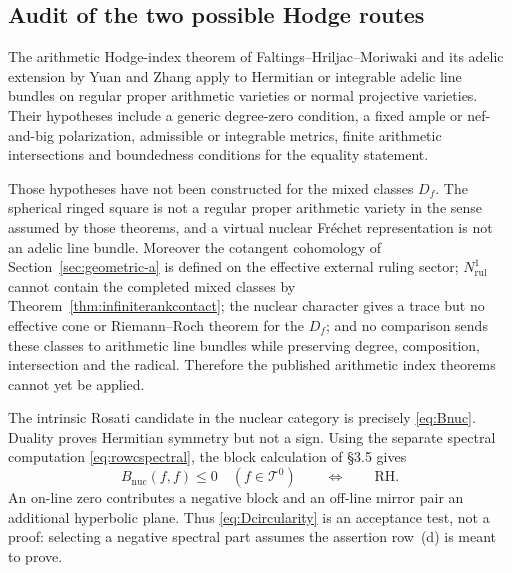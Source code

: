 \documentclass[11pt]{amsart}
\theoremstyle{definition}
\theoremstyle{remark}
\newcommand{\RH}{\mathrm{RH}}
\begin{document}
\subsection{Audit of the two possible Hodge routes}

The arithmetic Hodge-index theorem of Faltings--Hriljac--Moriwaki and its
adelic extension by Yuan and Zhang \cite[Theorems~1.1 and~1.3]{YuanZhang}
apply to Hermitian or integrable adelic line bundles on regular proper
arithmetic varieties or normal projective varieties.  Their hypotheses
include a generic degree-zero condition, a fixed ample or nef-and-big
polarization, admissible or integrable metrics, finite arithmetic
intersections and boundedness conditions for the equality statement.

Those hypotheses have not been constructed for the mixed classes $D_f$.
The spherical ringed square is not a regular proper arithmetic variety in
the sense assumed by those theorems, and a virtual nuclear Fr\'echet
representation is not an adelic line bundle.  Moreover the cotangent
cohomology of Section~\ref{sec:geometric-a} is defined on the effective
external ruling sector; $N^1_{\mathrm{rul}}$ cannot contain the completed
mixed classes by Theorem~\ref{thm:infiniterankcontact}; the nuclear character
gives a trace but no effective cone or Riemann--Roch theorem for the $D_f$;
and no comparison sends these classes to arithmetic line bundles while
preserving degree, composition, intersection and the radical.
Therefore the published arithmetic index theorems cannot yet be applied.

The intrinsic Rosati candidate in the nuclear category is precisely
\eqref{eq:Bnuc}.  Duality proves Hermitian symmetry but not a sign.  Using
the separate spectral computation \eqref{eq:rowcspectral}, the block
calculation of \S3.5 gives
\begin{equation}\label{eq:Dcircularity}
 B_{\mathrm{nuc}}(f,f)\le0\quad(f\in\mathcal T^0)
 \qquad\Longleftrightarrow\qquad \RH.
\end{equation}
An on-line zero contributes a negative block and an off-line mirror pair an
additional hyperbolic plane.  Thus \eqref{eq:Dcircularity} is an acceptance
test, not a proof: selecting a negative spectral part assumes the assertion
row~(d) is meant to prove.
\end{document}
